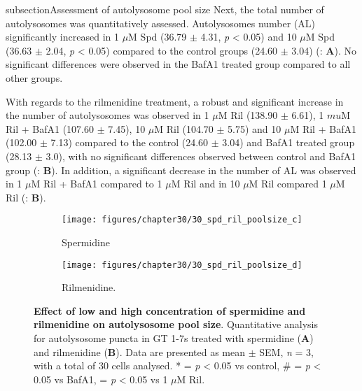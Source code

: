 {subsection{Assessment of autolysosome pool size}
Next, the total number of autolysosomes was quantitatively assessed.  Autolysosomes number (AL) significantly increased in 1 $\mu$M Spd (36.79 $\pm$ 4.31, \textit{p} < 0.05) and 10 $\mu$M Spd (36.63 $\pm$ 2.04, \textit{p} < 0.05) compared to the control groups (24.60 $\pm$ 3.04) (: \textbf{A}). No significant differences were observed in the BafA1 treated group compared to all other groups.

With regards to the rilmenidine treatment, a robust and significant increase in the number of autolysosomes was observed in 1 $\mu$M Ril (138.90 $\pm$ 6.61), 1 $mu$M Ril + BafA1 (107.60 $\pm$ 7.45), 10 $\mu$M Ril (104.70 $\pm$ 5.75) and 10 $\mu$M Ril + BafA1 (102.00 $\pm$ 7.13) compared to the control (24.60 $\pm$ 3.04) and BafA1 treated group (28.13 $\pm$ 3.0), with no significant differences observed between control and BafA1 group (: \textbf{B}). In addition, a significant decrease in the number of AL was observed in 1 $\mu$M Ril + BafA1 compared to 1 $\mu$M Ril and in 10 $\mu$M Ril compared 1 $\mu$M Ril (: \textbf{B}).

\begin{figure}[!htbp]
  \begin{subfigure}[b]{0.495\linewidth}
    \texttt{[image: figures/chapter30/30\_spd\_ril\_poolsize\_c]}
    \caption{Spermidine}
  \end{subfigure}
  \begin{subfigure}[b]{0.495\linewidth}
    \texttt{[image: figures/chapter30/30\_spd\_ril\_poolsize\_d]}
    \caption{Rilmenidine.}
  \end{subfigure}
  \caption[Effect of a low and high concentration of spermidine and rilmenidine on autolysosome pool size]{\textbf{Effect of low and high concentration of spermidine and rilmenidine on autolysosome pool size}. Quantitative analysis for autolysosome puncta in GT 1-7s treated with spermidine (\textbf{A}) and rilmenidine (\textbf{B}). Data are presented as mean $\pm$ SEM, \textit{n} = 3, with a total of 30 cells analysed. * = \textit{p} < 0.05 vs control, \# = \textit{p} < 0.05 vs BafA1, \@ = \textit{p} < 0.05 vs 1 $\mu$M Ril.}
  \label{fig:30_spd_ril_poolsize2}
\end{figure}

}
